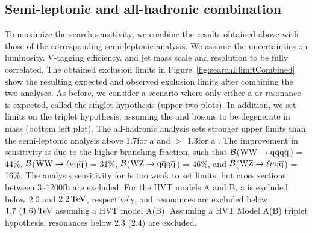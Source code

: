 \subsection{Semi-leptonic and all-hadronic combination}
\label{sec:searchI:resultsComb}
To maximize the search sensitivity, we combine the results obtained above with those of the corresponding semi-leptonic analysis. We assume the uncertainties on luminosity, V-tagging efficiency, and jet mass scale and resolution to be fully correlated. The obtained exclusion limits in Figure~\ref{fig:searchI:limitCombined} show the resulting expected and observed exclusion limits after combining the two analyses. As before, we consider a scenario where only either a \PWpr or \PZpr resonance is expected, called the singlet hypothesis (upper two plots). In addition, we set limits on the triplet hypothesis, assuming the \PWpr and \PZpr bosons to be degenerate in mass (bottom left plot). The all-hadronic analysis sets stronger upper limits than the semi-leptonic analysis above 1.7\TeV for a \PZpr and $>$ 1.3\TeV for a \PWpr. The improvement in sensitivity is due to the higher branching fraction, such that $\cal B$($\mathrm{W}\mathrm{W}\to\mathrm{q}\overline{\mathrm{q}}\mathrm{q}\overline{\mathrm{q}}$) = 44\%, $\cal B$($\mathrm{W}\mathrm{W}\to\ell\nu\mathrm{q}\overline{\mathrm{q}}$) = 31\%, $\cal B$($\mathrm{W}\mathrm{Z}\to\mathrm{q}\overline{\mathrm{q}}\mathrm{q}\overline{\mathrm{q}}$) = 46\%, and $\cal B$($\mathrm{W}\mathrm{Z}\to\ell\nu\mathrm{q}\overline{\mathrm{q}}$) = 16\%. 
The analysis sensitivity for \BulkG is too weak to set limits, but cross sections between 3--1200\unit{fb} are excluded.
For the HVT models A and B, a \PWpr is excluded below $2.0$ and $2.2 \,\text{Te\hspace{-.08em}V}$, respectively, and \PZpr resonances are excluded below $1.7~(1.6)\,\text{Te\hspace{-.08em}V}$ assuming a HVT model A(B). Assuming a HVT Model A(B) triplet hypothesis, resonances below 2.3 (2.4) \TeV are excluded.

